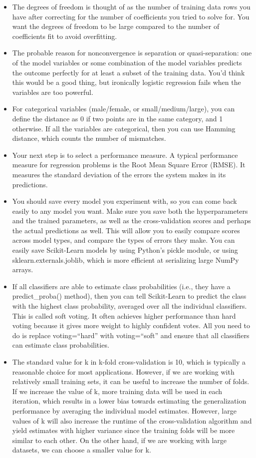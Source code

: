 \documentclass[]{book}
\begin{document}
\begin{itemize}
\item
  The degrees of freedom is thought of as the number of training data rows you have after correcting for the number of coefficients you tried to solve for. You want the degrees of freedom to be large compared to the number of coefficients fit to avoid overfitting.
\item
  The probable reason for nonconvergence is separation or quasi-separation: one of the model variables or some combination of the model variables predicts the outcome perfectly for at least a subset of the training data. You'd think this would be a good thing, but ironically logistic regression fails when the variables are too powerful.
\item
  For categorical variables (male/female, or small/medium/large), you can define the distance as 0 if two points are in the same category, and 1 otherwise. If all the variables are categorical, then you can use Hamming distance, which counts the number of mismatches.
\item
  Your next step is to select a performance measure. A typical performance measure for regression problems is the Root Mean Square Error (RMSE). It measures the standard deviation of the errors the system makes in its predictions.
\item
  You should save every model you experiment with, so you can come back easily to any model you want. Make sure you save both the hyperparameters and the trained parameters, as well as the cross-validation scores and perhaps the actual predictions as well. This will allow you to easily compare scores across model types, and compare the types of errors they make. You can easily save Scikit-Learn models by using Python's pickle module, or using sklearn.externals.joblib, which is more efficient at serializing large NumPy arrays.
\item
  If all classifiers are able to estimate class probabilities (i.e., they have a predict\_proba() method), then you can tell Scikit-Learn to predict the class with the highest class probability, averaged over all the individual classifiers. This is called soft voting. It often achieves higher performance than hard voting because it gives more weight to highly confident votes. All you need to do is replace voting=``hard'' with voting=``soft'' and ensure that all classifiers can estimate class probabilities.
\item
  The standard value for k in k-fold cross-validation is 10, which is typically a reasonable choice for most applications. However, if we are working with relatively small training sets, it can be useful to increase the number of folds. If we increase the value of k, more training data will be used in each iteration, which results in a lower bias towards estimating the generalization performance by averaging the individual model estimates. However, large values of k will also increase the runtime of the cross-validation algorithm and yield estimates with higher variance since the training folds will be more similar to each other. On the other hand, if we are working with large datasets, we can choose a smaller value for k.

\end{itemize}
\end{document}
